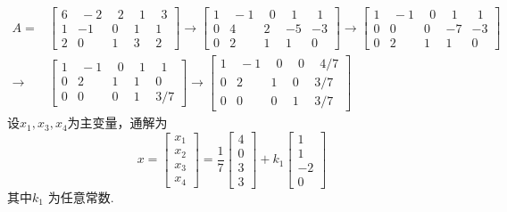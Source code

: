 \begin{displaymath}
\begin{aligned}
A=&\begin{bmatrix} 6&\ -2&\ \ 2&\ \ 1&\ \ 3\\1&-1&0&1&1\\2&0&1&3&2 \end{bmatrix}\rightarrow
\begin{bmatrix}1&\ -1&\ \ 0&\ \ 1&\ \ 1\\0&4&2&-5&-3\\0&2&1&1&0  \end{bmatrix}\rightarrow
\begin{bmatrix} 1&\ -1&\ \ 0&\ \ 1&\ \ 1\\0&0&0&-7&-3\\0&2&1&1&0 \end{bmatrix}\\ \rightarrow&
\begin{bmatrix}1&\ -1&\ \ 0&\ \ 1&\ \ 1\\0&2&1&1&0\\0&0&0&1&3/7  \end{bmatrix} \rightarrow
\begin{bmatrix}1&\ -1&\ \ 0&\ \ 0&\ \ 4/7\\0&2&1&0&3/7\\0&0&0&1&3/7  \end{bmatrix}
\end{aligned} \end{displaymath}
设$x_1,x_3,x_4$为主变量，通解为
\begin{displaymath}
x=\begin{bmatrix}x_1\\x_2\\x_3\\x_4\end{bmatrix}=\frac{1}{7}\begin{bmatrix}4\\0\\3\\3\end{bmatrix}
+k_1\begin{bmatrix}1\\1\\-2\\0\end{bmatrix}
\end{displaymath}
其中$k_1$ 为任意常数.

